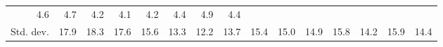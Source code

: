 \begin{tabular}{lllllllllllllll}
  \multicolumn{1}{r}{4.6} &
  \multicolumn{1}{r}{4.7} &
  \multicolumn{1}{r}{4.2} &
  \multicolumn{1}{r}{4.1} &
  \multicolumn{1}{r}{4.2} &
  \multicolumn{1}{r}{4.4} &
  \multicolumn{1}{r}{4.9} &
  \multicolumn{1}{r}{4.4} \\
\multicolumn{1}{l}{\hspace{2em}Std. dev.} &
  \multicolumn{1}{|r}{17.9} &
  \multicolumn{1}{r}{18.3} &
  \multicolumn{1}{r}{17.6} &
  \multicolumn{1}{r}{15.6} &
  \multicolumn{1}{r}{13.3} &
  \multicolumn{1}{r}{12.2} &
  \multicolumn{1}{r}{13.7} &
  \multicolumn{1}{r}{15.4} &
  \multicolumn{1}{r}{15.0} &
  \multicolumn{1}{r}{14.9} &
  \multicolumn{1}{r}{15.8} &
  \multicolumn{1}{r}{14.2} &
  \multicolumn{1}{r}{15.9} &
  \multicolumn{1}{r}{14.4} \\
\cline{1-15}
\end{tabular}
